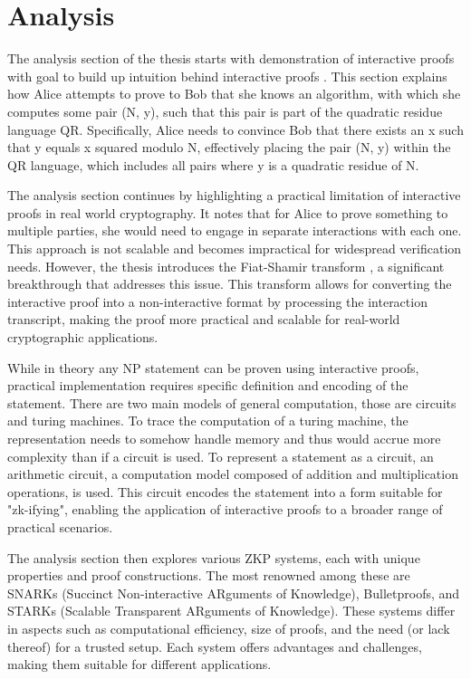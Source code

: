 \chapter{Analysis}

The analysis section of the thesis starts with demonstration of interactive
proofs with goal to build up intuition behind interactive proofs \cite{Goldwasser1989,youtubeMOOCLecture1}.
This section explains how Alice attempts to prove to Bob that she knows an
algorithm, with which she computes some pair (N, y), such that this pair is
part of the quadratic residue language QR. Specifically, Alice needs to
convince Bob that there exists an x such that y equals x squared modulo N,
effectively placing the pair (N, y) within the QR language, which includes all
pairs where y is a quadratic residue of N.

The analysis section continues by highlighting a practical limitation of
interactive proofs in real world cryptography. It notes that for Alice to
prove something to multiple parties, she would need to engage in separate
interactions with each one. This approach is not scalable and becomes
impractical for widespread verification needs. However, the thesis introduces
the Fiat-Shamir transform \cite{Fiat}, a significant breakthrough that addresses this
issue. This transform allows for converting the interactive proof into a
non-interactive format by processing the interaction transcript, making the
proof more practical and scalable for real-world cryptographic applications.

While in theory any NP statement \cite{goldreich1991proofs} can be proven using
interactive proofs, practical implementation requires specific definition and
encoding of the statement. There are two main models of general computation,
those are circuits and turing machines. To trace the computation of a turing
machine, the representation needs to somehow handle memory and thus would accrue
more complexity than if a circuit is used. To represent a statement as a
circuit, an arithmetic circuit, a computation model composed of addition and
multiplication operations, is used. This circuit encodes the statement into a
form suitable for "zk-ifying", enabling the application of interactive proofs
to a broader range of practical scenarios.

The analysis section then explores various ZKP systems, each with unique
properties and proof constructions. The most renowned among these are SNARKs
(Succinct Non-interactive ARguments of Knowledge), Bulletproofs, and STARKs
(Scalable Transparent ARguments of Knowledge). These systems differ in aspects
such as computational efficiency, size of proofs, and the need (or lack
thereof) for a trusted setup. Each system offers advantages and challenges,
making them suitable for different applications.

